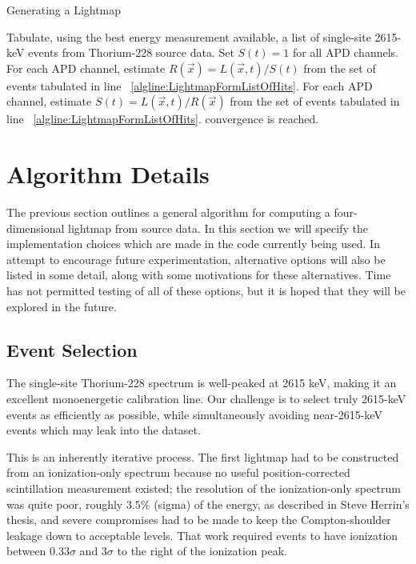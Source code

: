 \begin{algorithm}
\caption{Generating a Lightmap}
\label{alg:LightmapScheme}
\begin{algorithmic}[1]
\STATE Tabulate, using the best energy measurement available, a list of single-site 2615-keV events from Thorium-228 source data. \label{algline:LightmapFormListOfHits}
\STATE Set $S(t) = 1$ for all APD channels.
\REPEAT
  \STATE For each APD channel, estimate $R(\vec{x}) = L(\vec{x},t)/S(t)$ from the set of events tabulated in line ~\ref{algline:LightmapFormListOfHits}.
  \STATE For each APD channel, estimate $S(t) = L(\vec{x},t)/R(\vec{x})$ from the set of events tabulated in line ~\ref{algline:LightmapFormListOfHits}.
\UNTIL convergence is reached.
\end{algorithmic}
\end{algorithm}


\section{Algorithm Details}

The previous section outlines a general algorithm for computing a four-dimensional lightmap from source data.  In this section we will specify the implementation choices which are made in the code currently being used.  In attempt to encourage future experimentation, alternative options will also be listed in some detail, along with some motivations for these alternatives.  Time has not permitted testing of all of these options, but it is hoped that they will be explored in the future.

\subsection{Event Selection}\label{sec:LightmapEventSelection}

The single-site Thorium-228 spectrum is well-peaked at 2615 keV, making it an excellent monoenergetic calibration line.  Our challenge is to select truly 2615-keV events as efficiently as possible, while simultaneously avoiding near-2615-keV events which may leak into the dataset.

This is an inherently iterative process.  The first lightmap had to be constructed from an ionization-only spectrum because no useful position-corrected scintillation measurement existed; the resolution of the ionization-only spectrum was quite poor, roughly $3.5\%$ (sigma) of the energy, as described in Steve Herrin's thesis, and severe compromises had to be made to keep the Compton-shoulder leakage down to acceptable levels.  That work required events to have ionization between $0.33\sigma$ and $3\sigma$ to the right of the ionization peak.~\cite{ThesisSteve}

